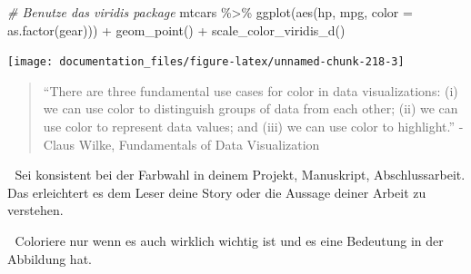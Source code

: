 \documentclass[
]{article}
\newenvironment{Shaded}{\begin{snugshade}}{\end{snugshade}}
\newcommand{\AttributeTok}[1]{\textcolor[rgb]{0.77,0.63,0.00}{#1}}
\newcommand{\CommentTok}[1]{\textcolor[rgb]{0.56,0.35,0.01}{\textit{#1}}}
\newcommand{\FunctionTok}[1]{\textcolor[rgb]{0.00,0.00,0.00}{#1}}
\newcommand{\NormalTok}[1]{#1}
\newcommand{\SpecialCharTok}[1]{\textcolor[rgb]{0.00,0.00,0.00}{#1}}
\begin{document}
\begin{Shaded}
\begin{Highlighting}[]
\CommentTok{\# Benutze das viridis package}
\NormalTok{mtcars }\SpecialCharTok{\%\textgreater{}\%}
  \FunctionTok{ggplot}\NormalTok{(}\FunctionTok{aes}\NormalTok{(hp, mpg, }\AttributeTok{color =} \FunctionTok{as.factor}\NormalTok{(gear))) }\SpecialCharTok{+}
  \FunctionTok{geom\_point}\NormalTok{() }\SpecialCharTok{+}
  \FunctionTok{scale\_color\_viridis\_d}\NormalTok{()}
\end{Highlighting}
\end{Shaded}

\begin{center}\texttt{[image: documentation\_files/figure-latex/unnamed-chunk-218-3]} \end{center}

\begin{quote}
``There are three fundamental use cases for color in data visualizations: (i) we can use color to distinguish groups of data from each other; (ii) we can use color to represent data values; and (iii) we can use color to highlight.'' - Claus Wilke, Fundamentals of Data Visualization
\end{quote}

🚨 Sei konsistent bei der Farbwahl in deinem Projekt, Manuskript, Abschlussarbeit. Das erleichtert es dem Leser deine Story oder die Aussage deiner Arbeit zu verstehen.

🚨 Coloriere nur wenn es auch wirklich wichtig ist und es eine Bedeutung in der Abbildung hat.
\end{document}
